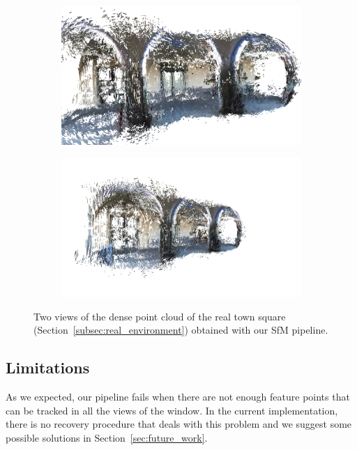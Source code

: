 \begin{figure}[h]
\centering
	\begin{subfigure}{0.8\linewidth}
		\centering
		\includegraphics[width=\linewidth]{img/reconstruction00.png}
	\end{subfigure}
	\begin{subfigure}{0.8\linewidth}
		\centering
		\includegraphics[width=\linewidth]{img/reconstruction01.png}
	\end{subfigure}
	\caption{Two views of the dense point cloud of the real town square
	(Section~\ref{subsec:real_environment}) obtained with our SfM pipeline.}
	\label{fig:real_reconstruction}
\end{figure}

\subsection{Limitations}\label{subsec:limitations}
As we expected, our pipeline fails when there are not enough feature points
that can be tracked in all the views of the window.
In the current implementation, there is no recovery procedure that deals with
this problem and we suggest some possible solutions in
Section~\ref{sec:future_work}.
